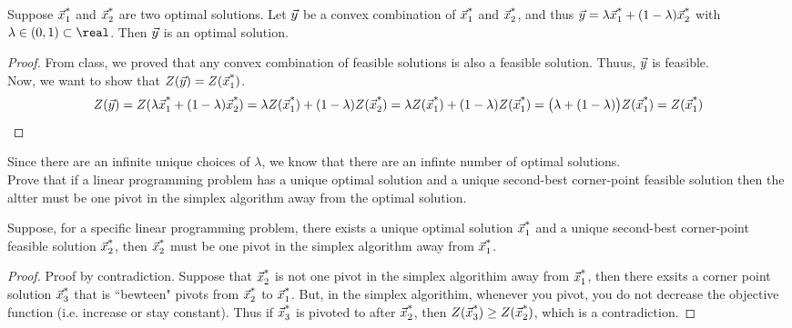 \begin{prob7}
Suppose ${\vec{x}_{1}}^\text{*}$ and ${\vec{x}_{2}}^\text{*}$ are two optimal solutions.  Let ${\vec{y}}$ be a convex combination of ${\vec{x}_{1}}^\text{*}$ and ${\vec{x}_{2}}^\text{*}$, and thus ${\vec{y}} = \lambda {\vec{x}_{1}}^\text{*} + (1-\lambda) {\vec{x}_{2}}^\text{*}$ with $\lambda \in (0,1) \subset \real$. Then ${\vec{y}}$ is an optimal solution.
\end{prob7}
\begin{proof}
From class, we proved that any convex combination of feasible solutions is also a feasible solution.  Thuus, ${\vec{y}}$ is feasible.\\
Now, we want to show that $Z({\vec{y}}) = Z({\vec{x}_{1}}^\text{*})$.
\begin{equation*}
Z({\vec{y}}) 	= Z(\lambda {\vec{x}_{1}}^\text{*} + (1-\lambda) {\vec{x}_{2}}^\text{*})
		= \lambda Z({\vec{x}_{1}}^\text{*}) + (1-\lambda) Z({\vec{x}_{2}}^\text{*}) 
		= \lambda Z({\vec{x}_{1}}^\text{*}) + (1-\lambda) Z({\vec{x}_{1}}^\text{*})
		= \big( \lambda  + (1-\lambda) \big) Z({\vec{x}_{1}}^\text{*})
		=Z({\vec{x}_{1}}^\text{*})
\end{equation*}
\end{proof}
Since there are an infinite unique choices of $\lambda$, we know that there are an infinte number of optimal solutions.\\

Prove that if a linear programming problem has a unique optimal solution and a unique second-best corner-point feasible solution then the altter must be one pivot in the simplex algorithm away from the optimal solution.

\begin{prob8}
Suppose, for a specific linear programming problem, there exists a unique optimal solution ${\vec{x}_{1}}^\text{*}$ and a unique second-best corner-point feasible solution ${\vec{x}_{2}}^\text{*}$, then ${\vec{x}_{2}}^\text{*}$ must be one pivot in the simplex algorithm away from ${\vec{x}_{1}}^\text{*}$.
\end{prob8}
\begin{proof}
Proof by contradiction.  Suppose that ${\vec{x}_{2}}^\text{*}$ is not one pivot in the simplex algorithim away from ${\vec{x}_{1}}^\text{*}$, then there exsits a corner point solution ${\vec{x}_{3}}^\text{*}$ that is ``bewteen" pivots from ${\vec{x}_{2}}^\text{*}$ to ${\vec{x}_{1}}^\text{*}$.  But, in the simplex algorithim, whenever you pivot, you do not decrease the objective function (i.e. increase or stay constant).  Thus if ${\vec{x}_{3}}^\text{*}$ is pivoted to after ${\vec{x}_{2}}^\text{*}$, then $Z({\vec{x}_{3}}^\text{*}) \geq Z({\vec{x}_{2}}^\text{*})$, which is a contradiction.
\end{proof} 

